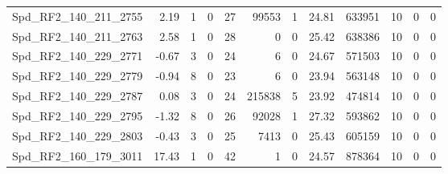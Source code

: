 \begin{longtable}[c]{@{}lrrrrrrrrrrr@{}}
Spd\_RF2\_140\_211\_2755      & 2.19                   & 1                       & 0                       & 27                     & 99553                   & 1                       & 24.81                   & 633951                   & 10                       & 0                        & 0                        \\
Spd\_RF2\_140\_211\_2763      & 2.58                   & 1                       & 0                       & 28                     & 0                       & 0                       & 25.42                   & 638386                   & 10                       & 0                        & 0                        \\
Spd\_RF2\_140\_229\_2771      & -0.67                  & 3                       & 0                       & 24                     & 6                       & 0                       & 24.67                   & 571503                   & 10                       & 0                        & 0                        \\
Spd\_RF2\_140\_229\_2779      & -0.94                  & 8                       & 0                       & 23                     & 6                       & 0                       & 23.94                   & 563148                   & 10                       & 0                        & 0                        \\
Spd\_RF2\_140\_229\_2787      & 0.08                   & 3                       & 0                       & 24                     & 215838                  & 5                       & 23.92                   & 474814                   & 10                       & 0                        & 0                        \\
Spd\_RF2\_140\_229\_2795      & -1.32                  & 8                       & 0                       & 26                     & 92028                   & 1                       & 27.32                   & 593862                   & 10                       & 0                        & 0                        \\
Spd\_RF2\_140\_229\_2803      & -0.43                  & 3                       & 0                       & 25                     & 7413                    & 0                       & 25.43                   & 605159                   & 10                       & 0                        & 0                        \\
Spd\_RF2\_160\_179\_3011      & 17.43                  & 1                       & 0                       & 42                     & 1                       & 0                       & 24.57                   & 878364                   & 10                       & 0                        & 0                        \\

\end{longtable}
